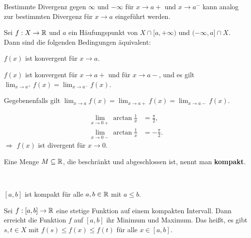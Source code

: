 \begin{bem} 
	Bestimmte Divergenz gegen $\infty$ und $-\infty$ für $x \to a + $ und $ x \to a^-$ kann analog zur bestimmten Divergenz für $x \to a$ eingeführt werden. 
\end{bem} 



\begin{thm} 
	Sei $f : X \to \mathbb{R}$ und $a$  ein Häufungspunkt von $X \cap [a,+\infty)$ und $(-\infty,a] \cap X$. Dann sind die folgenden Bedingungen äquivalent: 
	\begin{enumi}
		\item $f(x)$ ist konvergent für $x \to a$. 
		\item $f(x)$ ist konvergent für $x \to a+$ und für $x \to a-$, und es gilt $\lim_{x \to a^+} f(x) = \lim_{x \to a^-} f(x)$. 
	\end{enumi}  
	Gegebenenfalls gilt $\lim_{x \to a} f(x) = \lim_{x \to a + } f(x) = \lim_{x \to a-} f(x)$. 
\end{thm} 

\begin{bsp}
	\begin{align*}
		\lim_{x \to 0+} \arctan \frac{1}{x} & = \frac{\pi}{2}, 
		\\ \lim_{x \to 0-} \arctan \frac{1}{x} & = - \frac{\pi}{2}. 
	\end{align*}
	$\Rightarrow$ $f(x)$ ist divergent für $x \to 0$. 
\end{bsp} 

\begin{defn} 
	Eine Menge $M \subseteq \mathbb{R}$, die beschränkt und abgeschlossen ist, nennt man \textbf{kompakt}. 
\end{defn} 

\begin{bsp} { \ } 
	\begin{enuma}
		\item $[a,b]$ ist kompakt für alle $a,b \in \mathbb{R}$ mit $a \le b$. 
	\end{enuma} 
\end{bsp} 

\begin{thm}
	Sei $f : [a,b] \to \mathbb{R}$ eine stetige Funktion auf einem kompakten Intervall. Dann erreicht die Funktion $f$ auf $[a,b]$ ihr Minimum und Maximum. Das heißt, es gibt $s,t \in X$ mit $f(s) \le f(x) \le f(t)$ für alle $x \in [a,b]$. 
\end{thm} 


